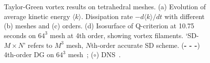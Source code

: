 \begin{figure}[htbp]
\centering
{}\quad\ 
\\
\\
\caption{\small Taylor-Green vortex results on tetrahedral meshes.
(a) Evolution of average kinetic energy $\langle k \rangle$.
Dissipation rate $-d \langle k \rangle/dt$ with different (b) meshes and (c) orders.
(d) Isosurface of Q-criterion at 10.75 seconds on $64^3$ mesh at 4th order, showing vortex filaments.
`SD-$M \times N$' refers to $M^3$ mesh, $N$th-order accurate SD scheme.
(\textbf{- - -}) 4th-order DG on $64^3$ mesh~\cite{beck:12}; ($\circ$) DNS~\cite{debonis:13}.}
\label{dissrate}
\end{figure}

